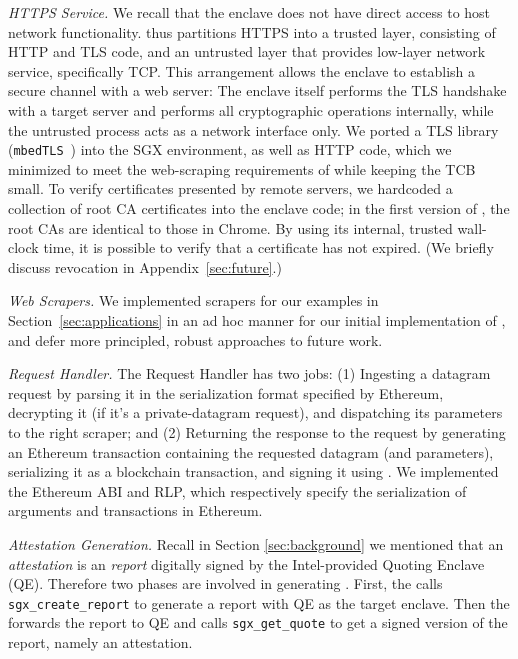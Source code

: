 \vspace{2mm}

\noindent\emph{HTTPS Service.} We recall that the enclave does not have direct
access to host network functionality. \tc thus partitions HTTPS into a trusted
layer, consisting of HTTP and TLS code, and an untrusted layer that provides
low-layer network service, specifically TCP.  This arrangement allows the
enclave to establish a secure channel with a web server: The enclave itself
performs the TLS handshake with a target server and performs all cryptographic
operations internally, while the untrusted process acts as a network interface
only. We ported a TLS library (\texttt{mbedTLS}~\cite{mbedtls}) into the SGX environment, as well as
HTTP code, which we minimized to meet the web-scraping requirements of \tc while
keeping the TCB small. To verify certificates presented by remote servers, we
hardcoded a collection of root CA certificates into the enclave code; in the
first version of \tc, the root CAs are identical to those in Chrome. By using its internal, trusted wall-clock time, it is possible to verify that a certificate has not expired. (We briefly discuss revocation in Appendix~\ref{sec:future}.)

\vspace{2mm}

\noindent\emph{Web Scrapers.} We implemented scrapers for our examples in Section~\ref{sec:applications} in an ad hoc manner for our initial implementation of \tc, and defer more principled, robust approaches to future work. 

\vspace{2mm}

\noindent\emph{Request Handler.} The Request Handler has two jobs: (1) Ingesting
a datagram request by parsing it in the serialization format specified by
Ethereum, decrypting it (if it's a private-datagram request), and dispatching
its parameters to the right scraper; and (2) Returning the response to the
request by generating an Ethereum transaction containing the requested datagram
(and parameters), serializing it as a blockchain transaction, and signing it
using \skTC. We implemented the Ethereum ABI and RLP, which respectively specify
the serialization of arguments and transactions in Ethereum. 

\vspace{2mm}

\noindent\emph{Attestation Generation.} Recall in Section \ref{sec:background}
we mentioned that an \emph{attestation} is an \emph{report} digitally signed by
the Intel-provided Quoting Enclave (QE).  Therefore two phases are involved in
generating \att. First, the \encname calls \texttt{sgx\_create\_report} to
generate a report with QE as the target enclave. Then the \medname forwards the
report to QE and calls \texttt{sgx\_get\_quote} to get a signed version of the
report, namely an attestation.

